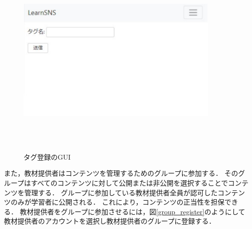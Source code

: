 \begin{figure}[htbp]
    \begin{center}
        \includegraphics[width=10cm,height=9cm,keepaspectratio]{tag-crop.pdf}\\
    \end{center}
    \caption{タグ登録のGUI}
    \label{tag}
\end{figure}

\newpage
また，教材提供者はコンテンツを管理するためのグループに参加する．
そのグループはすべてのコンテンツに対して公開または非公開を選択することでコンテンツを管理する．
グループに参加している教材提供者全員が認可したコンテンツのみが学習者に公開される．
これにより，コンテンツの正当性を担保できる．
教材提供者をグループに参加させるには，図\ref{group_register}のようにして教材提供者のアカウントを選択し教材提供者のグループに登録する．


